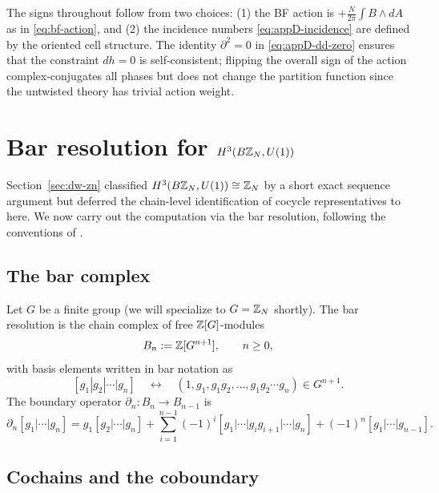 \begin{remark}\label{rem:appD-signs}
The signs throughout follow from two choices: (1) the BF action is $+\frac{N}{2\pi}\int B\wedge dA$ as in \eqref{eq:bf-action}, and (2) the incidence numbers \eqref{eq:appD-incidence} are defined by the oriented cell structure. The identity $\partial^2=0$ in \eqref{eq:appD-dd-zero} ensures that the constraint $dh=0$ is self-consistent; flipping the overall sign of the action complex-conjugates all phases but does not change the partition function since the untwisted theory has trivial action weight.
\end{remark}

\section{Bar resolution for \texorpdfstring{$H^3(B\mathbb{Z}_N, U(1))$}{H3(BZN, U(1))}}\label{sec:appD-bar-resolution}

Section~\ref{sec:dw-zn} classified $H^3(B\mathbb{Z}_N,U(1))\cong\mathbb{Z}_N$ by a short exact sequence argument but deferred the chain-level identification of cocycle representatives to here. We now carry out the computation via the bar resolution, following the conventions of \cite{Brown1982}.

\subsection{The bar complex}

Let $G$ be a finite group (we will specialize to $G=\mathbb{Z}_N$ shortly). The bar resolution is the chain complex of free $\mathbb{Z}[G]$-modules
\begin{equation}\label{eq:appD-bar-modules}
B_n:=\mathbb{Z}[G^{n+1}],\qquad n\geq 0,
\end{equation}
with basis elements written in bar notation as
\begin{equation}\label{eq:appD-bar-notation}
[g_1|g_2|\cdots|g_n]\quad\longleftrightarrow\quad(1,g_1,g_1g_2,\dots,g_1g_2\cdots g_n)\in G^{n+1}.
\end{equation}
The boundary operator $\partial_n:B_n\to B_{n-1}$ is
\begin{equation}\label{eq:appD-bar-boundary}
\partial_n[g_1|\cdots|g_n]=g_1[g_2|\cdots|g_n]+\sum_{i=1}^{n-1}(-1)^i[g_1|\cdots|g_ig_{i+1}|\cdots|g_n]+(-1)^n[g_1|\cdots|g_{n-1}].
\end{equation}

\subsection{Cochains and the coboundary}

